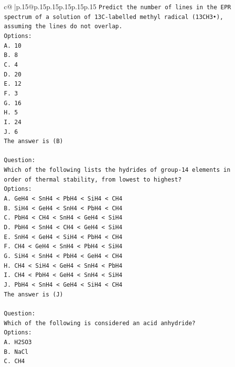 \documentclass{article}
\begin{document}
{\begin{supertabular}{c@{$\;$}|p{.15\linewidth}@{}p{.15\linewidth}p{.15\linewidth}p{.15\linewidth}p{.15\linewidth}p{.15\linewidth}}
{{{\texttt{Predict the number of lines in the EPR spectrum of a solution of 13C{-}labelled methyl radical (13CH3•), assuming the lines do not overlap.} \\
\texttt{Options:} \\
\texttt{A. 10} \\
\texttt{B. 8} \\
\texttt{C. 4} \\
\texttt{D. 20} \\
\texttt{E. 12} \\
\texttt{F. 3} \\
\texttt{G. 16} \\
\texttt{H. 5} \\
\texttt{I. 24} \\
\texttt{J. 6} \\
\texttt{The answer is (B)} \\
\\ 
\texttt{Question:} \\
\texttt{Which of the following lists the hydrides of group{-}14 elements in order of thermal stability, from lowest to highest?} \\
\texttt{Options:} \\
\texttt{A. GeH4 < SnH4 < PbH4 < SiH4 < CH4} \\
\texttt{B. SiH4 < GeH4 < SnH4 < PbH4 < CH4} \\
\texttt{C. PbH4 < CH4 < SnH4 < GeH4 < SiH4} \\
\texttt{D. PbH4 < SnH4 < CH4 < GeH4 < SiH4} \\
\texttt{E. SnH4 < GeH4 < SiH4 < PbH4 < CH4} \\
\texttt{F. CH4 < GeH4 < SnH4 < PbH4 < SiH4} \\
\texttt{G. SiH4 < SnH4 < PbH4 < GeH4 < CH4} \\
\texttt{H. CH4 < SiH4 < GeH4 < SnH4 < PbH4} \\
\texttt{I. CH4 < PbH4 < GeH4 < SnH4 < SiH4} \\
\texttt{J. PbH4 < SnH4 < GeH4 < SiH4 < CH4} \\
\texttt{The answer is (J)} \\
\\ 
\texttt{Question:} \\
\texttt{Which of the following is considered an acid anhydride?} \\
\texttt{Options:} \\
\texttt{A. H2SO3} \\
\texttt{B. NaCl} \\
\texttt{C. CH4} \\
}}}
\end{supertabular}}
\end{document}
